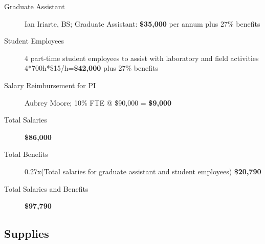 \documentclass[14pt,english,letterpaper]{scrartcl}
\begin{document}
\begin{description}
	\item[Graduate Assistant] Ian Iriarte, BS; Graduate Assistant: \textbf{\$35,000} per annum plus 27\% benefits
	
	\item[Student Employees]  4 part-time student employees to assist with laboratory and field activities 4*700h*\$15/h=\textbf{\$42,000} plus 27\% benefits
	
	\item[Salary Reimbursement for PI] Aubrey Moore; 10\% FTE @ \$90,000 = \textbf{\$9,000}
	
	\item[Total Salaries] \textbf{\$86,000}
		
	\item[Total Benefits] 0.27x(Total salaries for graduate assistant and student employees) \textbf{\$20,790}
		
	\item[Total Salaries and Benefits]  \textbf{\$97,790}
			
\end{description}

\subsection{Supplies} 

\end{document}
